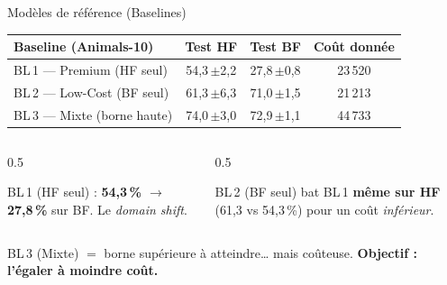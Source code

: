\documentclass[aspectratio=169, 11pt]{beamer}
\newcommand{\res}[2]{#1\,{\scriptsize$\pm$#2}}
\begin{document}
\begin{frame}{Modèles de référence (Baselines)}
  \footnotesize
  \setlength{\tabcolsep}{5pt}\renewcommand{\arraystretch}{1.25}
  \begin{center}
  \begin{tabular}{@{}lccc@{}}
    \toprule
    \rowcolor{headerbg}
    \textbf{Baseline (Animals-10)} & \textbf{Test HF} & \textbf{Test BF} & \textbf{Coût donnée}\\
    \midrule
    BL\,1 — Premium (HF seul)   & \res{54,3}{2,2} & \res{27,8}{0,8} & 23\,520\\
    BL\,2 — Low-Cost (BF seul)  & \res{61,3}{6,3} & \res{71,0}{1,5} & 21\,213\\
    BL\,3 — Mixte (borne haute) & \res{74,0}{3,0} & \res{72,9}{1,1} & 44\,733\\
    \bottomrule
  \end{tabular}
  \end{center}
  \vspace{0.2em}
  \begin{columns}[T]
    \begin{column}{0.5\textwidth}
      \begin{card}
        BL\,1 (HF seul) : \textbf{54,3\,\% $\rightarrow$ 27,8\,\%} sur BF.
        Le \emph{domain shift}.
      \end{card}
    \end{column}
    \begin{column}{0.5\textwidth}
      \begin{card}
        BL\,2 (BF seul) bat BL\,1 \textbf{même sur HF}
        (61,3 vs 54,3\,\%) pour un coût \emph{inférieur}.
      \end{card}
    \end{column}
  \end{columns}
  \vspace{0.2em}
  \begin{center}\scriptsize\color{muted}
    BL\,3 (Mixte) $=$ borne supérieure à atteindre… mais coûteuse. \textbf{Objectif : l'égaler à moindre coût.}
  \end{center}
\end{frame}
\end{document}
